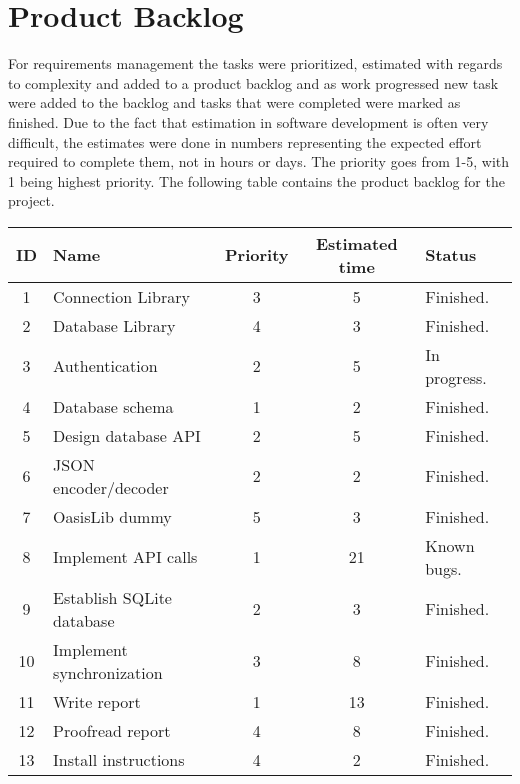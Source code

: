 \section{Product Backlog}
For requirements management the tasks were prioritized, estimated with regards to complexity and added to a product backlog and as work progressed new task were added to the backlog and tasks that were completed were marked as finished. Due to the fact that estimation in software development is often very difficult, the estimates were done in numbers representing the expected effort required to complete them, not in hours or days. The priority goes from 1-5, with 1 being highest priority. The following table contains the product backlog for the project.

\begin{center}
	\begin{tabular}{| c | p{4cm} | c | c | l |}
	\hline
	\textbf{ID} 	& \textbf{Name} 										& \textbf{Priority} 	& \textbf{Estimated time} 	& \textbf{Status} 			\\ 	\hline
	1 	& Connection Library 						& 3 		& 5 				& Finished. 		\\	\hline
	2 	& Database Library 							& 4 		& 3 				& Finished. 		\\	\hline
	3 	& Authentication 							& 2 		& 5 				& In progress. 		\\ 	\hline
	4 	& Database schema 							& 1 		& 2 				& Finished. 		\\	\hline
	5 	& Design database API 						& 2 		& 5 				& Finished. 		\\	\hline
	6 	& JSON encoder/decoder 						& 2 		& 2 				& Finished. 		\\	\hline
	7 	& OasisLib dummy							& 5 		& 3 				& Finished. 		\\	\hline
	8 	& Implement API calls						& 1 		& 21 				& Known bugs. 		\\ 		\hline
	9 	& Establish SQLite database 				& 2 		& 3 				& Finished. 		\\	\hline
	10	& Implement synchronization					& 3 		& 8 				& Finished. 		\\	\hline
	11	& Write report								& 1 		& 13 				& Finished. 		\\	\hline
	12	& Proofread report 							& 4 		& 8 				& Finished. 		\\ 	\hline
	13	& Install instructions 						& 4 		& 2 				& Finished. 		\\	\hline
	\end{tabular}
\end{center}